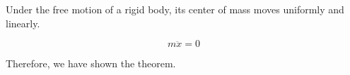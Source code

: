 Under the free motion of a rigid body, its center of mass moves uniformly and linearly.

$$m\ddot{x} = 0$$

Therefore, we have shown the theorem.